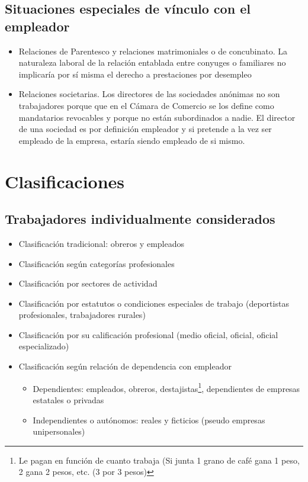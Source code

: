 \documentclass[spanish,12pt,a4paper,titlepage]{report}
\begin{document}
\subsection{Situaciones especiales de vínculo con el empleador}
\begin{itemize}
	\item Relaciones de Parentesco y relaciones matrimoniales o de concubinato. La naturaleza laboral de la relación entablada entre conyuges o familiares no implicaría por sí misma el derecho a prestaciones por desempleo
	\item Relaciones societarias. Los directores de las sociedades anónimas no son trabajadores porque que en el Cámara de Comercio se los define como mandatarios revocables y porque no están subordinados a nadie. El director de una sociedad es por definición empleador y si pretende a la vez ser empleado de la empresa, estaría siendo empleado de  si  mismo.
\end{itemize}

\section{Clasificaciones}
\subsection{Trabajadores individualmente considerados} 
\begin{itemize}
	\item Clasificación tradicional: obreros y empleados
	\item Clasificación según categorías profesionales
	\item Clasificación  por sectores de actividad
	\item Clasificación  por estatutos o condiciones especiales de trabajo (deportistas profesionales, trabajadores rurales)
	\item Clasificación por su calificación profesional (medio oficial, oficial, oficial especializado)
	\item Clasificación  según relación de dependencia con empleador
	\begin{itemize}
		\item Dependientes: empleados, obreros, destajistas\footnote{Le pagan en función de cuanto trabaja (Si junta 1 grano de café gana 1 peso, 2 gana 2 pesos, etc. (3 por 3 pesos)}, dependientes de empresas estatales o privadas
		\item Independientes o autónomos: reales y ficticios (pseudo empresas unipersonales)
	\end{itemize}
\end{itemize} 
\end{document}
